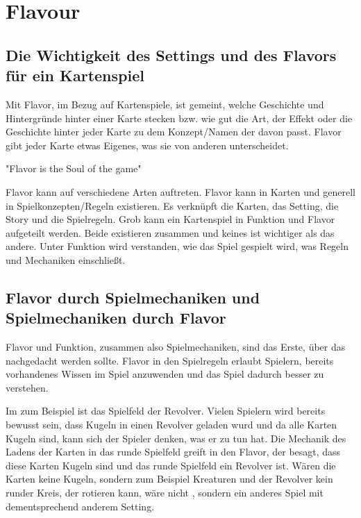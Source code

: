 
\section{Flavour}\label{sec:flavour}

\renewcommand{\kapitelautor}{Autor: Philip Jankovic}

\subsection{Die Wichtigkeit des Settings und des Flavors für ein Kartenspiel}\label{subsec:wichtigkeit-des-flavours}

%
Mit Flavor, im Bezug auf Kartenspiele, ist gemeint, welche Geschichte und Hintergründe hinter einer Karte stecken bzw.
wie gut die Art, der Effekt oder die Geschichte hinter jeder Karte zu dem Konzept/Namen der davon passt.
Flavor gibt jeder Karte etwas Eigenes, was sie von anderen unterscheidet.

"Flavor is the Soul of the game"


Flavor kann auf verschiedene Arten auftreten. Flavor kann in Karten und generell in Spielkonzepten/Regeln existieren.
Es verknüpft die Karten, das Setting, die Story und die Spielregeln. Grob kann ein Kartenspiel in Funktion und Flavor aufgeteilt werden.
Beide existieren zusammen und keines ist wichtiger als das andere.
Unter Funktion wird verstanden, wie das Spiel gespielt wird, was Regeln und Mechaniken einschließt.


\subsection{Flavor durch Spielmechaniken und Spielmechaniken durch Flavor}

Flavor und Funktion, zusammen also Spielmechaniken, sind das Erste, über das nachgedacht werden sollte.
Flavor in den Spielregeln erlaubt Spielern, bereits vorhandenes Wissen im Spiel anzuwenden und das Spiel dadurch besser zu verstehen. 


Im \FF zum Beispiel ist das Spielfeld der Revolver. Vielen Spielern wird bereits bewusst sein, dass Kugeln in einen
Revolver geladen wurd und da alle Karten Kugeln sind, kann sich der Spieler denken, was er zu tun hat. Die Mechanik des Ladens
der Karten in das runde Spielfeld greift in den Flavor, der besagt, dass diese Karten Kugeln sind und das runde Spielfeld
ein Revolver ist. Wären die Karten keine Kugeln, sondern zum Beispiel Kreaturen und der Revolver kein runder Kreis,
der rotieren kann, wäre \FF nicht \FF, sondern ein anderes Spiel mit dementsprechend anderem Setting.


